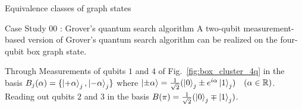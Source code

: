 \documentclass[final]{beamer}
\newlength{\colwidth}
\begin{document}
\begin{frame}[t]
\begin{columns}[t]
\begin{column}{\colwidth}
\begin{block}{Equivalence classes of graph states}



                \end{block}
                \begin{block}{Case Study 00 : Grover's quantum search algorithm}
                    A two-qubit measurement-based version of Grover's quantum search algorithm can be realized
                    on the four-qubit box graph state.

                    Through Measurements of qubits $1$ and $4$ of Fig.~\ref{fig:box_cluster_4q} in the
                    basis $B_j(\alpha) = \{\ket{+\alpha}_j, \ket{-\alpha}_j\}$
                    where $\ket{\pm \alpha} = \frac{1}{\sqrt{2}}(\ket{0}_j \pm
                    e^{i\alpha}\ket{1}_j) \quad (\alpha \in \mathbb{R})$. Reading out
                    qubits $2$ and $3$ in the basis $B(\pi) =
                    \frac{1}{\sqrt{2}}(\ket{0}_j \mp \ket{1}_j)$.


                    \begin{figure}[H]
                        \raggedright
                        \begin{minipage}[c]{0.40\textwidth}
\end{minipage}
\end{figure}
\end{block}
\end{column}
\end{columns}
\end{frame}
\end{document}
